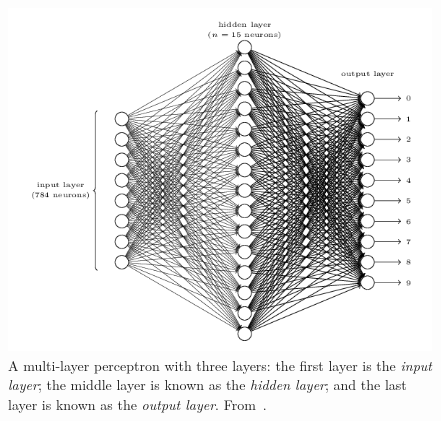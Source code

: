 \begin{figure}
    \centering
    \includegraphics[scale=0.4]{figuras/capitulo-3/tres-capas.png}
    \caption{A multi-layer perceptron with three layers: the first layer is the \emph{input layer}; the middle layer is known as the \emph{hidden layer}; and the last layer is known as the \emph{output layer}. From~\cite{nielsenNeuralNetworksDeep2015}.}
    \label{fig:hidden-layer}
\end{figure}

